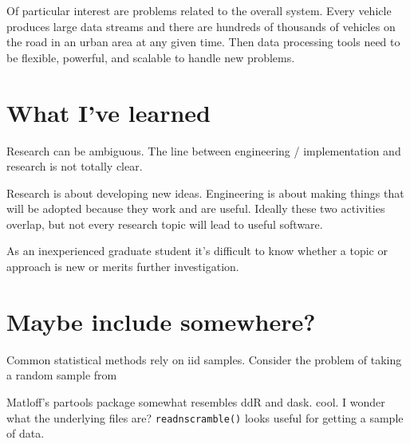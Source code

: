 \documentclass[12pt]{article}
\begin{document}
Of particular interest are problems related to the overall system. Every
vehicle produces large data streams and there are hundreds of
thousands of vehicles on the road in an urban area at any given time.
Then data processing tools need to be flexible, powerful, and scalable to
handle new problems.

\section{What I've learned}

Research can be ambiguous. The line between engineering / implementation
and research is not totally clear.

Research is about developing new ideas. Engineering is about making
things that will be adopted because they work and are useful. Ideally these
two activities overlap, but not every research topic will lead to useful
software.

As an inexperienced graduate student it's difficult to know whether a topic
or approach is new or merits further investigation.


 

\section{Maybe include somewhere?}


Common statistical methods rely on iid samples. Consider the problem of
taking a random sample from

Matloff's partools package \cite{R-partools} somewhat resembles ddR and
dask. cool. I wonder what the underlying files are?
\texttt{readnscramble()} looks useful for getting a sample of data.
\end{document}

